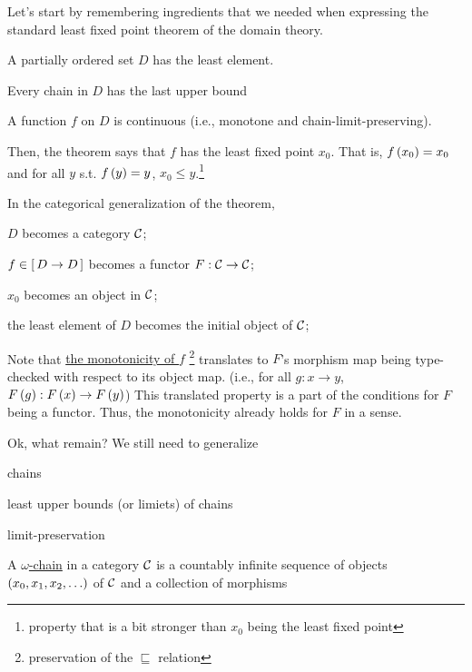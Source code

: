\begin{enumcirc}
	\item
	Let's start by remembering ingredients that we needed when expressing the
	standard least fixed point theorem of the domain theory.
	\begin{enumrm}
		\item
		A partially ordered set $D$ has the least element.
		\item
		Every chain in $D$ has the last upper bound
		\item
		A function $f$ on $D$ is continuous (i.e., monotone and
		chain-limit-preserving).
	\end{enumrm}
	Then, the theorem says that $f$ has the least fixed point $x_0$.
	That is, $f\left( x_0 \right) = x_0$ and for all $y$ s.t. $f\left( y \right) = y$, $x_0 \leq
		y$.\footnote{property that is a bit stronger than $x_0$ being the least fixed
		point}
	\item
	In the categorical generalization of the theorem,
	\begin{enumrm}
		\item
		$D$ becomes a category $\mathcal{C}$;
		\item
		$f \in \left[ \, D \to D \, \right]$ becomes a functor $F : \mathcal{C} \to \mathcal{C}$;
		\item
		$x_0$ becomes an object in $\mathcal{C}$;
		\item
		the least element of $D$ becomes the initial object of $\mathcal{C}$;
	\end{enumrm}
	Note that \ul{the monotonicity of $f$} \footnote{preservation of the
		$\sqsubseteq$ relation} translates to $F$'s morphism map being type-checked
	with respect to its object map.
	(i.e., for all $g: x \to y$, $F\left( g \right): F\left( x \right) \to F\left( y \right)$)
	This translated property is a part of the conditions for $F$ being a functor.
	Thus, the monotonicity already holds for $F$ in a sense.
	\item
	Ok, what remain?
	We still need to generalize
	\begin{enumrm}
		\item
		chains
		\item
		least upper bounds (or limiets) of chains
		\item
		limit-preservation
	\end{enumrm}
	\item
	A \ul{$\omega$-chain} in a category $\mathcal{C}$ is a countably infinite sequence of
	objects $\left( x_0, x_1, x_2, \ldots \right)$ of $\mathcal{C}$ and a collection of morphisms

\end{enumcirc}
